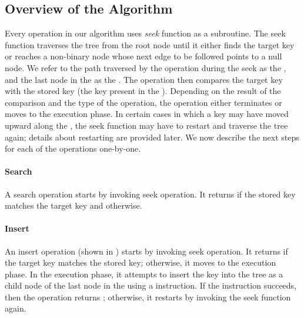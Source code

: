 \begin{limitscope}
\section{Overview of the Algorithm}

Every operation in our algorithm uses \emph{seek} function as a subroutine. The seek function traverses the  tree from the root node until it either finds the target key or reaches a non-binary node whose next edge to be followed points to a null node. We refer to the path traversed by the operation during the seek  as the \emph{\accesspath}, and the last node in the \accesspath{} as the \emph{\terminalnode}. The operation then compares the target key with the stored key (the key present in the \terminalnode). Depending on the result of the comparison and the type of the operation, the operation either terminates or moves to the execution phase. In certain cases in which a key may have moved upward along the \accesspath, the seek function may have to restart and traverse the tree again; details about restarting are provided later. We now describe the next steps for each of the operations one-by-one.

\paragraph*{Search} 
A search operation starts by invoking seek operation. It returns \true{} if the stored key matches the target key and \false{} otherwise. 

\paragraph*{Insert}

An insert operation (shown in ) starts by invoking seek operation. It returns \false{} if the target key matches the stored key; otherwise, it moves to the execution phase. In the execution phase, it attempts to insert the key into the tree as a child node of the last node in the \accesspath{} using a \CAS{} instruction. If the instruction succeeds, then the operation returns \true{}; otherwise, it restarts by invoking the seek function again.


\end{limitscope}
